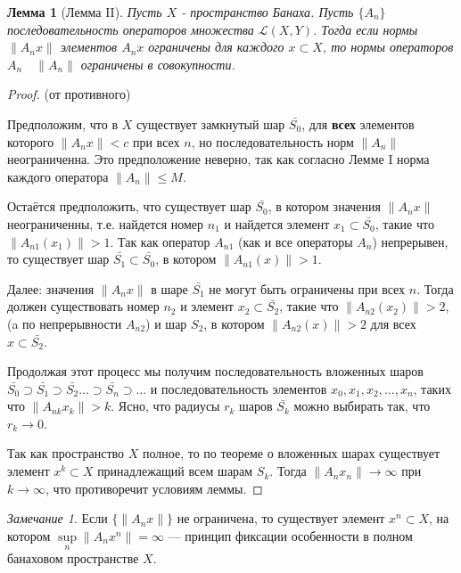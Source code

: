 \documentclass[12pt,a4paper,titlepage, oneside]{book}
\theoremstyle{definition}
\theoremstyle{plain}
\theoremstyle{remark}
\newtheorem*{remark}{Замечание}
\theoremstyle{remark}
\theoremstyle{remark}
\theoremstyle{plain}
\newtheorem*{lemma}{Лемма}
\theoremstyle{plain}
\begin{document}
\begin{lemma}[Лемма II]
Пусть $X$ - пространство Банаха. Пусть $\lbrace A_n\rbrace$ последовательность операторов множества $\mathcal{L}(X,Y)$. Тогда если нормы $\lVert A_n x\rVert$ элементов $A_n x$ ограничены для каждого $x \subset X$, то нормы операторов $A_n \quad \lVert A_n\rVert$ ограничены в совокупности.
\end{lemma}

\begin{proof}
(от противного)

Предположим, что в $X$ существует замкнутый шар $\bar{S_0}$, для \textbf{всех} элементов которого $\lVert A_n x\rVert < c$ при всех $n$, но последовательность норм $\lVert A_n\rVert$ неограниченна. Это предположение неверно, так как согласно Лемме I норма каждого оператора $\lVert A_n\rVert \le M$.

Остаётся предположить, что существует шар $\bar{S_0}$, в котором значения $\lVert A_n x\rVert$ неограниченны, т.е. найдется номер $n_1$ и найдется элемент $x_1 \subset \bar{S_0}$, такие что $\lVert A_{n1} (x_1)\rVert > 1$. Так как оператор $A_{n1}$ (как и все операторы $A_n$) непрерывен, то существует шар $\bar{S_1} \subset \bar{S_0}$, в котором $\lVert A_{n1} (x)\rVert > 1$.

Далее: значения $\lVert A_n x\rVert$ в шаре $\bar{S_1}$ не могут быть ограничены при всех $n$. Тогда должен существовать номер $n_2$ и элемент $x_2 \subset \bar{S_2}$, такие что $\lVert A_{n2} (x_2)\rVert > 2$, (a по непрерывности $A_{n2}$) и шар $S_2$, в котором $\lVert A_{n2} (x)\rVert > 2$ для всех $x \subset \bar{S_2}$.

Продолжая этот процесс мы получим последовательность вложенных шаров $\bar{S_0} \supset \bar{S_1} \supset \bar{S_2} \ldots \supset \bar{S_n} \supset \ldots$ и последовательность элементов $x_0, x_1, x_2, \ldots, x_n$, таких что $\lVert A_{nk} x_k\rVert > k$. Ясно, что радиусы $r_k$ шаров $\bar{S_k}$ можно выбирать так, что $r_k \to 0$.

Так как пространство $X$ полное, то по теореме о вложенных шарах существует элемент $x^k \subset X$ принадлежащий всем шарам $S_k$. Тогда $\lVert A_n x_n\rVert \to \infty$ при $k \to \infty$, что противоречит условиям леммы.
\end{proof}

\begin{remark}
Если $\lbrace \lVert A_n x\rVert \rbrace$ не ограничена, то существует элемент $x^n \subset X$, на котором $\sup\limits_{n}\lVert A_n x^n\rVert = \infty$ --- принцип фиксации особенности в полном банаховом пространстве $X$.
\end{remark}
\end{document}
